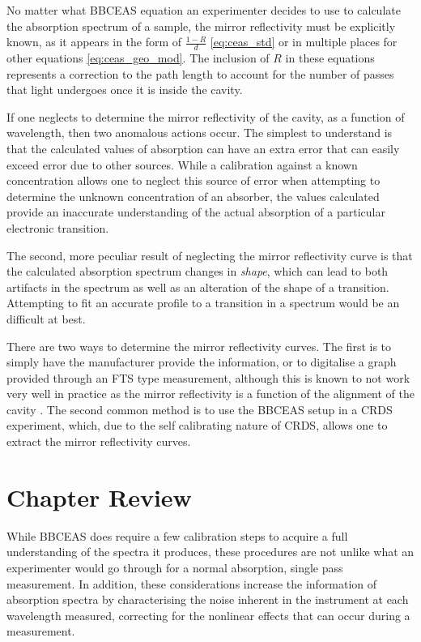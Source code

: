 No matter what \ac{BBCEAS} equation an experimenter decides to use to calculate
the absorption spectrum of a sample, the mirror reflectivity must be explicitly
known, as it appears in the form of $\tfrac{1-R}{d}$ \eqref{eq:ceas_std} or in
multiple places for other equations \eqref{eq:ceas_geo_mod}. The inclusion of
$R$ in these equations represents a correction to the path length to account
for the number of passes that light undergoes once it is inside the cavity.

If one neglects to determine the mirror reflectivity of the cavity, as a
function of wavelength, then two anomalous actions occur. The simplest to
understand is that the calculated values of absorption can have an extra error
that can easily exceed error due to other sources. While a calibration against
a known concentration allows one to neglect this source of error when
attempting to determine the unknown concentration of an absorber, the values
calculated provide an inaccurate understanding of the actual absorption of a
particular electronic transition.

The second, more peculiar result of neglecting the mirror reflectivity curve is
that the calculated absorption spectrum changes in \emph{shape}, which  can
lead to both artifacts in the spectrum as well as an alteration of the shape of
a transition. Attempting to fit an accurate profile to a transition in a
spectrum would be an difficult at best.

There are two ways to determine the mirror reflectivity curves. The first is
to simply have the manufacturer provide the information, or to digitalise a
graph provided through an \ac{FTS} type measurement, although this is known to
not work very well in practice as the mirror reflectivity is a function of the
alignment of the cavity \cite{Berden:2009wk}. The second common method is to
use the \ac{BBCEAS} setup in a \ac{CRDS} experiment, which, due to the self
calibrating nature of \ac{CRDS}, allows one to extract the mirror reflectivity
curves.



\section*{Chapter Review}

While \ac{BBCEAS} does require a few calibration steps to acquire a full
understanding of the spectra it produces, these procedures are not unlike what
an experimenter would go through for a normal absorption, single pass
measurement. In addition, these considerations increase the information of
absorption spectra by characterising the noise inherent in the instrument at
each wavelength measured, correcting for the nonlinear
effects that can occur during a measurement.
